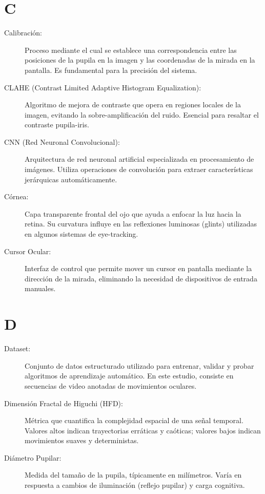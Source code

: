\section*{C}

\begin{description}
    \item[Calibración:] Proceso mediante el cual se establece una correspondencia entre las posiciones de la pupila en la imagen y las coordenadas de la mirada en la pantalla. Es fundamental para la precisión del sistema.
    
    \item[CLAHE (Contrast Limited Adaptive Histogram Equalization):] Algoritmo de mejora de contraste que opera en regiones locales de la imagen, evitando la sobre-amplificación del ruido. Esencial para resaltar el contraste pupila-iris.
    
    \item[CNN (Red Neuronal Convolucional):] Arquitectura de red neuronal artificial especializada en procesamiento de imágenes. Utiliza operaciones de convolución para extraer características jerárquicas automáticamente.
    
    \item[Córnea:] Capa transparente frontal del ojo que ayuda a enfocar la luz hacia la retina. Su curvatura influye en las reflexiones luminosas (glints) utilizadas en algunos sistemas de eye-tracking.
    
    \item[Cursor Ocular:] Interfaz de control que permite mover un cursor en pantalla mediante la dirección de la mirada, eliminando la necesidad de dispositivos de entrada manuales.
\end{description}

\section*{D}

\begin{description}
    \item[Dataset:] Conjunto de datos estructurado utilizado para entrenar, validar y probar algoritmos de aprendizaje automático. En este estudio, consiste en secuencias de video anotadas de movimientos oculares.
    
    \item[Dimensión Fractal de Higuchi (HFD):] Métrica que cuantifica la complejidad espacial de una señal temporal. Valores altos indican trayectorias erráticas y caóticas; valores bajos indican movimientos suaves y deterministas.
    
    \item[Diámetro Pupilar:] Medida del tamaño de la pupila, típicamente en milímetros. Varía en respuesta a cambios de iluminación (reflejo pupilar) y carga cognitiva.
\end{description}

